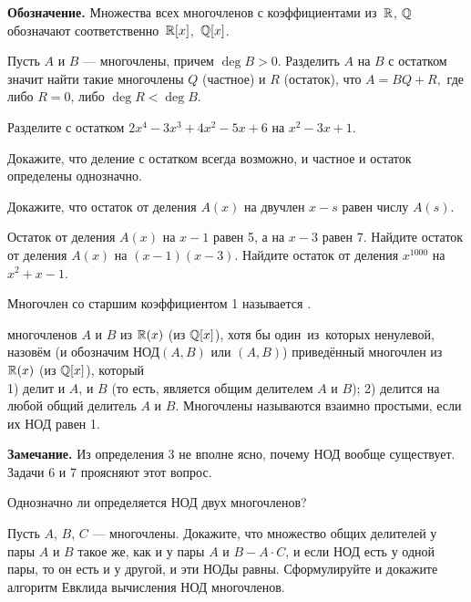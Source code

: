 \documentclass[a4paper,11pt]{article}
\begin{document}

\smallskip

\noindent
{\bfseries Обозначение.} Множества всех многочленов с коэффициентами из~$\mathbb{R}$,
$\mathbb{Q}$ %
обозначают соответственно~$\mathbb{R}[x]$,~$\mathbb{Q}[x]$. %

\smallskip


\label{del}  Пусть $A$ и $B$ --- многочлены, причем $\deg B>0.$
Разделить $A$ на $B$ с остатком значит найти такие многочлены
$Q$ (частное) и $R$ (остаток), что $A=BQ+R,$ где либо $R=0$, либо $\deg R<\deg B$.

  Разделите с остатком $2x^4-3x^3+4x^2-5x+6$ на $x^2-3x+1$.

Докажите, что  деление с остатком всегда возможно, и частное и остаток
определены однозначно.

 Докажите, что остаток от деления $A(x)$
на двучлен $x-s$ равен числу $A(s)$.


Остаток от деления $A(x)$ на $x-1$ равен 5, а на $x-3$ равен 7.
Найдите остаток от деления $A(x)$ на $(x-1)(x-3).$
Найдите остаток от деления $x^{1000}$ на $x^2+x-1$.

 Многочлен со старшим коэффициентом 1 называется .

 
многочленов $A$ и $B$ из $\mathbb{R}(x)$ (из $\mathbb{Q}[x]$),
хотя бы один~из~которых ненулевой, назовём (и обозначим $\text{НОД}(A,B)$ или $(A,B)$) приведённый многочлен из $\mathbb{R}(x)$ (из $\mathbb{Q}[x]$), который
\\
1) делит и $A$, и $B$ (то есть, является общим делителем $A$ и $B$);
2) делится на любой общий делитель $A$ и $B$.
Многочлены называются взаимно простыми, если их НОД равен 1.


\noindent
{\small {\bf Замечание.} Из определения 3 не вполне ясно, почему НОД вообще существует. Задачи 6 и 7 проясняют этот вопрос.}

 Однозначно ли определяется {НОД} двух многочленов?

Пусть $A$, $B$, $C$ --- многочлены. Докажите, что множество общих делителей у пары $A$ и $B$
такое же, как и у пары $A$ и $B-A\cdot C$, и если НОД есть у одной пары, то он есть и у другой, и эти НОДы равны.
Сформулируйте и докажите алгоритм Евклида вычисления {НОД} многочленов.
\end{document}
